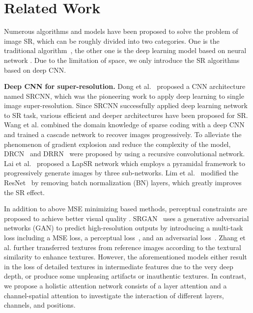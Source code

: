 \documentclass[runningheads]{llncs}
\begin{document}
\section{Related Work}
Numerous algorithms and models have been proposed to solve the problem of image SR, which can be roughly divided into two categories. One is the traditional algorithm~\cite {yang2008image,huang2018robust,huang2015single}, the other one is the deep learning model based on neural network \cite{kim2016accurate,dong2016accelerating,lai2017deep,lim2017enhanced,zhang2018residual,kim2016deeply,tai2017image,tai2017memnet}. Due to the limitation of space, we only introduce the SR algorithms based on deep CNN.\par   
\textbf{Deep CNN for super-resolution.} Dong et al.~\cite{dong2014learning} proposed a CNN architecture named SRCNN, which was the pioneering work to apply deep learning to single image super-resolution. 
Since SRCNN successfully applied deep learning network to SR task, various efficient and deeper architectures have been proposed for SR.
Wang et al. \cite{wang2015deep}combined the domain knowledge of sparse coding with a
deep CNN and trained a cascade network to recover images progressively.
To alleviate the phenomenon of gradient explosion and reduce the complexity of the model, DRCN~\cite{kim2016deeply} and DRRN~\cite{tai2017image} were proposed by using a recursive convolutional network.
Lai et al.~\cite{lai2017deep} proposed a LapSR network which employs a pyramidal framework to progressively generate  images by three sub-networks. 
Lim et al.~\cite{lim2017enhanced} modified the ResNet~\cite{he2016deep} by removing batch normalization (BN) layers, which greatly improves the SR effect.


In addition to above MSE minimizing based methods, perceptual constraints are proposed to achieve better visual quality \cite{sajjadi2017enhancenet}. 
SRGAN~\cite{ledig2017photo} uses a generative adversarial networks (GAN) to predict high-resolution outputs by introducing a multi-task loss including a MSE loss, a perceptual loss~\cite{johnson2016perceptual}, and an adversarial loss~\cite{NIPS2014_5423}.
Zhang et al. \cite{zhang2019image} further transferred textures from reference images according to the textural similarity to enhance textures.
However, the aforementioned models either result in the loss of detailed textures in intermediate features due to the very deep depth, or produce some unpleasing artifacts or inauthentic textures. 
In contrast, we propose a holistic attention network consists of a layer attention and a channel-spatial attention to investigate the interaction of different layers, channels, and positions.
\end{document}
